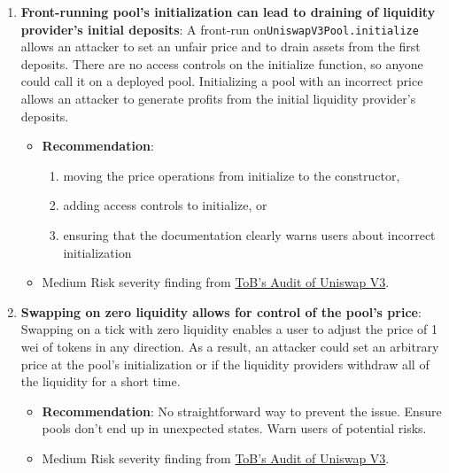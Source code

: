 \begin{enumerate}
\item\textbf{Front-running pool’s initialization can lead to draining of liquidity provider’s initial deposits}: A front-run on\linebreak\verb|UniswapV3Pool.initialize| allows an attacker to set an unfair price and to drain assets from the first deposits. There are no access controls on the initialize function, so anyone could call it on a deployed pool. Initializing a pool with an incorrect price allows an attacker to generate profits from the initial liquidity provider’s deposits.
	\begin{itemize}
	\item\textbf{Recommendation}:
	    \begin{enumerate}
	    \item moving the price operations from initialize to the constructor,
	    \item adding access controls to initialize, or
	    \item ensuring that the documentation clearly warns users about incorrect initialization
	    \end{enumerate}
	\item Medium Risk severity finding from \href{https://github.com/Uniswap/uniswap-v3-core/blob/main/audits/tob/audit.pdf}{ToB’s Audit of Uniswap V3}.
	\end{itemize}

\item\textbf{Swapping on zero liquidity allows for control of the pool’s price}: Swapping on a tick with zero liquidity enables a user to adjust the price of 1 wei of tokens in any direction. As a result, an attacker could set an arbitrary price at the pool’s initialization or if the liquidity providers withdraw all of the liquidity for a short time.
	\begin{itemize}
	\item\textbf{Recommendation}: No straightforward way to prevent the issue. Ensure pools don’t end up in unexpected states. Warn users of potential risks.
	\item Medium Risk severity finding from \href{https://github.com/Uniswap/uniswap-v3-core/blob/main/audits/tob/audit.pdf}{ToB’s Audit of Uniswap V3}.
	\end{itemize}


\end{enumerate}
